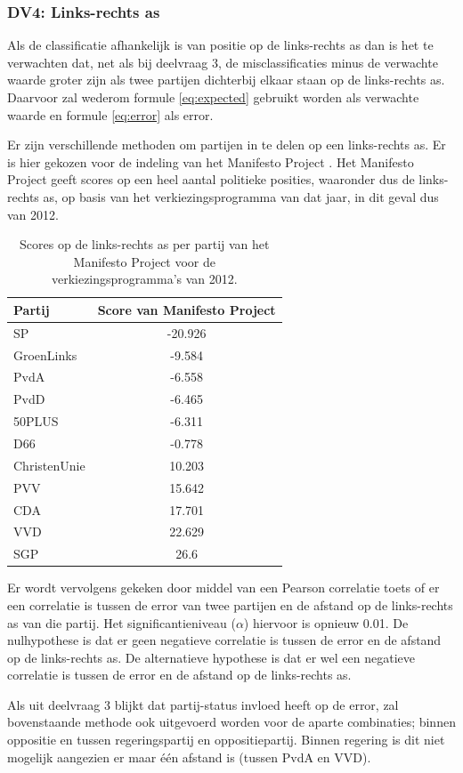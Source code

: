 \subsubsection{DV4: Links-rechts as}
Als de classificatie afhankelijk is van positie op de links-rechts as dan is het te verwachten dat, net als bij deelvraag 3, de misclassificaties minus de verwachte waarde groter zijn als twee partijen dichterbij elkaar staan op de links-rechts as.  Daarvoor zal wederom formule \ref{eq:expected} gebruikt worden als verwachte waarde en formule \ref{eq:error} als error.\par
Er zijn verschillende methoden om partijen in te delen op een links-rechts as. Er is hier gekozen voor de indeling van het Manifesto Project \cite{Volkens:2017}. Het Manifesto Project geeft scores op een heel aantal politieke posities, waaronder dus de links-rechts as, op basis van het verkiezingsprogramma van dat jaar, in dit geval dus van 2012.\par
\begin{table}[H]
\centering
\caption{Scores op de links-rechts as per partij van het Manifesto Project voor de verkiezingsprogramma's van 2012.}
\label{my-label}
\centering
\begin{tabular}{lc}
\toprule
Partij  & Score van Manifesto Project \\
\midrule
SP           & -20.926 \\ 
GroenLinks   & -9.584 \\ 
PvdA         & -6.558 \\ 
PvdD         & -6.465 \\ 
50PLUS       & -6.311\\ 
D66          & -0.778\\ 
ChristenUnie & 10.203\\ 
PVV          & 15.642\\ 
CDA          & 17.701\\
VVD          & 22.629\\ 
SGP          & 26.6\\ 
\bottomrule
\end{tabular}
\end{table}
Er wordt vervolgens gekeken door middel van een Pearson correlatie toets of er een correlatie is tussen de error van twee partijen en de afstand op de links-rechts as van die partij. Het significantieniveau ($\alpha$) hiervoor is opnieuw 0.01. De nulhypothese is dat er geen negatieve correlatie is tussen de error en de afstand op de links-rechts as. De alternatieve hypothese is dat er wel een negatieve correlatie is tussen de error en de afstand op de links-rechts as.\par
Als uit deelvraag 3 blijkt dat partij-status invloed heeft op de error, zal bovenstaande methode ook uitgevoerd worden voor de aparte combinaties; binnen oppositie en tussen regeringspartij en oppositiepartij. Binnen regering is dit niet mogelijk aangezien er maar één afstand is (tussen PvdA en VVD).\par

